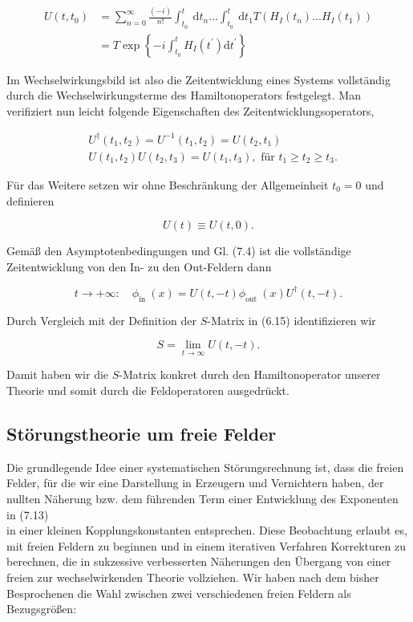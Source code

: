\documentclass[10pt, letterpaper]{article}
\begin{document}
$$
\begin{aligned}
U\left(t, t_{0}\right) & =\sum_{n=0}^{\infty} \frac{(-i)}{n!} \int_{t_{0}}^{t} \mathrm{~d} t_{n} \ldots \int_{t_{0}}^{t} \mathrm{~d} t_{1} T\left(H_{I}\left(t_{n}\right) \ldots H_{I}\left(t_{1}\right)\right) \\
& =T \exp \left\{-i \int_{t_{0}}^{t} H_{I}\left(t^{\prime}\right) \mathrm{d} t^{\prime}\right\}
\end{aligned}
$$

Im Wechselwirkungsbild ist also die Zeitentwicklung eines Systems vollständig durch die Wechselwirkungsterme des Hamiltonoperators festgelegt. Man verifiziert nun leicht folgende Eigenschaften des Zeitentwicklungsoperators,

$$
\begin{aligned}
& U^{\dagger}\left(t_{1}, t_{2}\right)=U^{-1}\left(t_{1}, t_{2}\right)=U\left(t_{2}, t_{1}\right) \\
& U\left(t_{1}, t_{2}\right) U\left(t_{2}, t_{3}\right)=U\left(t_{1}, t_{3}\right), \text { für } t_{1} \geq t_{2} \geq t_{3} .
\end{aligned}
$$

Für das Weitere setzen wir ohne Beschränkung der Allgemeinheit $t_{0}=0$ und definieren

$$
U(t) \equiv U(t, 0) .
$$

Gemäß den Asymptotenbedingungen und Gl. (7.4) ist die vollständige Zeitentwicklung von den In- zu den Out-Feldern dann

$$
t \rightarrow+\infty: \quad \phi_{\text {in }}(x)=U(t,-t) \phi_{\text {out }}(x) U^{\dagger}(t,-t) .
$$

Durch Vergleich mit der Definition der $S$-Matrix in (6.15) identifizieren wir

$$
S=\lim _{t \rightarrow \infty} U(t,-t) .
$$

Damit haben wir die $S$-Matrix konkret durch den Hamiltonoperator unserer Theorie und somit durch die Feldoperatoren ausgedrückt.

\subsection*{Störungstheorie um freie Felder}
Die grundlegende Idee einer systematischen Störungsrechnung ist, dass die freien Felder, für die wir eine Darstellung in Erzeugern und Vernichtern haben, der nullten Näherung bzw. dem führenden Term einer Entwicklung des Exponenten in (7.13)\\
in einer kleinen Kopplungskonstanten entsprechen. Diese Beobachtung erlaubt es, mit freien Feldern zu beginnen und in einem iterativen Verfahren Korrekturen zu berechnen, die in sukzessive verbesserten Näherungen den Übergang von einer freien zur wechselwirkenden Theorie vollziehen. Wir haben nach dem bisher Besprochenen die Wahl zwischen zwei verschiedenen freien Feldern als Bezugsgrößen:
\end{document}
